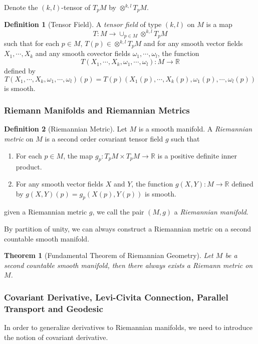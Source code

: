 \documentclass[12pt,a4paper,draft]{article}  %
\newtheorem{theorem}{Theorem}[section]
\theoremstyle{definition}
\newtheorem{definition}{Definition}[section]
\numberwithin{equation}{section}
\newcommand{\RR}{\mathbb{R}}
\begin{document}
Denote the $(k,l)$-tensor of $T_p M$ by $\otimes^{k,l} T_p M$.
\begin{definition}[Tensor Field]
        A \emph{tensor field} of type $(k,l)$ on $M$ is a map $$T: M \to \cup_{p\in M} \otimes^{k,l} T_p M$$ such that for each $p\in M$, $T(p) \in \otimes^{k,l} T_p M$ and for any smooth vector fields $X_1, \cdots, X_k$ and any smooth covector fields $\omega_1, \cdots, \omega_l$, the function $$T(X_1, \cdots, X_k, \omega_1, \cdots, \omega_l): M \to \RR$$ defined by
\[
T(X_1, \cdots, X_k, \omega_1, \cdots, \omega_l)(p) = T(p)(X_1(p), \cdots, X_k(p), \omega_1(p), \cdots, \omega_l(p))
\]
is smooth.
\end{definition}
\subsubsection{Riemann Manifolds and Riemannian Metrics}

\begin{definition}[Riemannian Metric]
        Let $M$ is a smooth manifold. A \emph{Riemannian metric} on $M$ is a second order covariant tensor field $g$ such that 
        \begin{enumerate}
                \item For each $p \in M$, the map $g_p: T_p M \times T_p M \to \RR$ is a positive definite inner product.
                \item For any smooth vector fields $X$ and $Y$, the function $g(X,Y): M \to \RR$ defined by $g(X,Y)(p) = g_p(X(p), Y(p))$ is smooth.
        \end{enumerate}
        given a Riemannian metric $g$, we call the pair $(M,g)$ a \emph{Riemannian manifold}.
\end{definition}
By partition of unity, we can always construct a Riemannian metric on a second countable smooth manifold. 
\begin{theorem}[Fundamental Theorem of Riemannian Geometry]
        Let $M$ be a second countable smooth manifold, then there always exists a Riemann metric on $M$.
\end{theorem}

\subsubsection{Covariant Derivative, Levi-Civita Connection, Parallel Transport and Geodesic}
In order to generalize derivatives to Riemannian manifolds, we need to introduce the notion of covariant derivative. 
\end{document}
